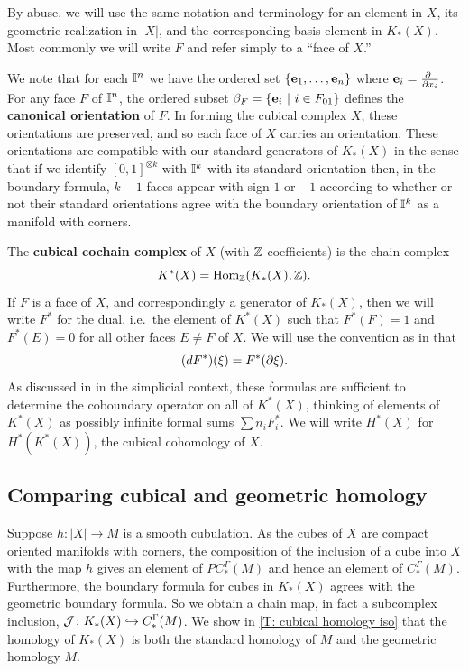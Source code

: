 By abuse, we will use the same notation and terminology for an element in $X$, its geometric realization in $|X|$,
and the corresponding basis element in $K_*(X)$.
Most commonly we will write $F$ and refer simply to a ``face of $X$.''

We note that for each $\mathbb{I}^n$ we have the ordered set $\{\mathbf{e}_1, \dots, \mathbf{e}_n\}$ where $\mathbf{e}_i = \frac{\partial\ }{\partial x_i}$.
For any face $F$ of $\mathbb{I}^n$, the ordered subset $\beta_F = \{\mathbf{e}_i\ |\ i \in F_{01}\}$ defines the \textbf{canonical orientation} of $F$.
In forming the cubical complex $X$, these orientations are preserved, and so each face of $X$ carries an orientation.
These orientations are compatible with our standard generators of $K_*(X)$ in the sense that if we identify $[0,1]^{ \otimes k}$ with $\mathbb{I}^k$ with its standard orientation then, in the boundary formula, $k-1$ faces appear with sign $1$ or $-1$ according to whether or not their standard orientations agree with the boundary orientation of $\mathbb{I}^k$ as a manifold with corners.

The \textbf{cubical cochain complex} of $X$ (with $\mathbb{Z}$ coefficients) is the chain complex
\[
K^*(X) = \textup{Hom}_{\mathbb{Z}}(K_*(X), \mathbb{Z}).
\]
If $F$ is a face of $X$, and correspondingly a generator of $K_*(X)$, then we will write $F^*$ for the dual, i.e.\ the element of $K^*(X)$ such that $F^*(F) = 1$ and $F^*(E) = 0$ for all other faces $E\neq F$ of $X$.
We will use the convention as in \cite[Section 42]{Mun84} that
$$(dF^*)(\xi) = F^*(\partial \xi).$$
As discussed in \cite[Section 42]{Mun84} in the simplicial context, these formulas are sufficient to determine the coboundary operator on all of $K^*(X)$, thinking of elements of $K^*(X)$ as possibly infinite formal sums $\sum n_i F_i^*$.
We will write $H^*(X)$ for $H^*(K^*(X))$, the cubical cohomology of $X$.

\subsection{Comparing cubical and geometric homology}\label{S: cubical and geometric homology}

Suppose $h \colon |X| \to M$ is a smooth cubulation.
As the cubes of $X$ are compact oriented manifolds with corners, the composition of the inclusion of a cube into $X$ with the map $h$ gives an element of $PC_*^\Gamma(M)$ and hence an element of $C_*^\Gamma(M)$.
Furthermore, the boundary formula for cubes in $K_*(X)$ agrees with the geometric boundary formula.
So we obtain a chain map, in fact a subcomplex inclusion, $\mathcal{J} \colon K_*(X) \hookrightarrow C^\Gamma_*(M)$.
We show in \cref{T: cubical homology iso} that the homology of $K_*(X)$ is both the standard homology of $M$ and the geometric homology $M$.

